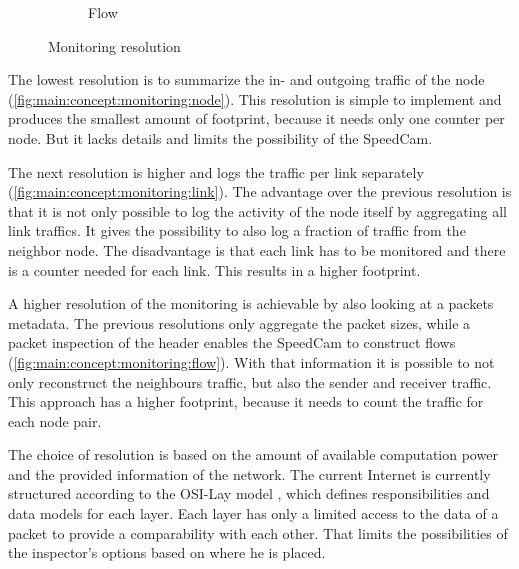 \documentclass[thesis.tex]{subfiles}
\begin{document}
\begin{figure}[h]
\begin{subfigure}{.3\linewidth}
		\caption{Flow}
		\label{fig:main:concept:monitoring:flow}
	\end{subfigure}
	
	\caption{Monitoring resolution}
	\label{fig:main:concept:monitoring}
\end{figure}
The lowest resolution is to summarize the in- and outgoing traffic of the node  (\autoref{fig:main:concept:monitoring:node}). This resolution is simple to implement and produces the smallest amount of footprint, because it needs only one counter per node. But it lacks details and limits the possibility of the SpeedCam.

The next resolution is higher and logs the traffic per link separately  (\autoref{fig:main:concept:monitoring:link}). The advantage over the previous resolution is that it is not only possible to log the activity of the node itself by aggregating all link traffics. It gives the possibility to also log a fraction of traffic from the neighbor node. The disadvantage is that each link has to be monitored and there is a counter needed for each link. This results in a higher footprint.

A higher resolution of the monitoring is achievable by also looking at a packets metadata. The previous resolutions only aggregate the packet sizes, while a packet inspection of the header enables the SpeedCam to construct flows (\autoref{fig:main:concept:monitoring:flow}). With that information it is possible to not only reconstruct the neighbours traffic, but also the sender and receiver traffic. This approach has a higher footprint, because it needs to count the traffic for each node pair.

The choice of resolution is based on the amount of available computation power and the provided information of the network. The current Internet is currently structured according to the OSI-Lay model \cite{Partridge.1988}, which defines responsibilities and data models for each layer. Each layer has only a limited access to the data of a packet to provide a comparability with each other. That limits the possibilities of the inspector's options based on where he is placed.
\end{document}
